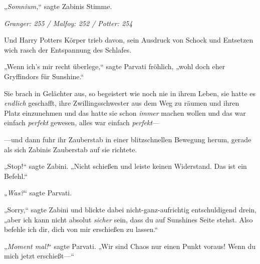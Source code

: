 „\emph{Somnium,}“ sagte Zabinis Stimme.

\later

\emph{Granger: 255 / Malfoy: 252 / Potter: 254}

Und Harry Potters Körper trieb davon, sein Ausdruck von Schock und Entsetzen wich rasch der Entspannung des Schlafes.

„Wenn ich’s mir recht überlege,“ sagte Parvati fröhlich, „wohl doch eher Gryffindors für Sunshine.“

Sie brach in Gelächter aus, so begeistert wie noch nie in ihrem Leben, sie hatte es \emph{endlich} geschafft, ihre Zwillingsschwester aus dem Weg zu räumen und ihren Platz einzunehmen und das hatte sie schon \emph{immer} machen wollen und das war einfach \emph{perfekt} gewesen, alles war einfach \emph{perfekt}—

—und dann fuhr ihr Zauberstab in einer blitzschnellen Bewegung herum, gerade als sich Zabinis Zauberstab auf sie richtete.

„Stop!“ sagte Zabini. „Nicht schießen und leiste keinen Widerstand. Das ist ein Befehl.“

„\emph{Was?}“ sagte Parvati.

„Sorry,“ sagte Zabini und blickte dabei nicht-ganz-aufrichtig entschuldigend drein, „aber ich kann nicht absolut \emph{sicher} sein, dass du auf Sunshines Seite stehst. Also befehle ich dir, dich von mir erschießen zu lassen.“

„\emph{Moment mal!}“ sagte Parvati. „Wir sind Chaos nur einen Punkt voraus! Wenn du mich jetzt erschießt—“

